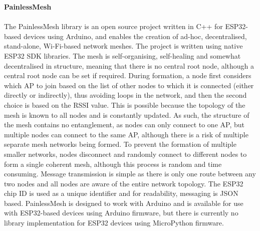 \textbf{PainlessMesh}\\\\
The PainlessMesh library is an open source project written in C++ for ESP32-based devices using Arduino, and enables the creation of ad-hoc, decentralised, stand-alone, Wi-Fi-based network meshes. The project is written using native ESP32 SDK libraries. The mesh is self-organising, self-healing and somewhat decentralised in structure, meaning that there is no central root node, although a central root node can be set if required. During formation, a node first considers which AP to join based on the list of other nodes to which it is connected (either directly or indirectly), thus avoiding loops in the network, and then the second choice is based on the RSSI value. This is possible because the topology of the mesh is known to all nodes and is constantly updated. As such, the structure of the mesh contains no entanglement, as nodes can only connect to one AP, but multiple nodes can connect to the same AP, although there is a risk of multiple separate mesh networks being formed. To prevent the formation of multiple smaller networks, nodes disconnect and randomly connect to different nodes to form a single coherent mesh, although this process is random and time consuming. Message transmission is simple as there is only one route between any two nodes and all nodes are aware of the entire network topology. The ESP32 chip ID is used as a unique identifier and for readability, messaging is JSON based.
PainlessMesh is designed to work with Arduino and is available for use with ESP32-based devices using Arduino firmware, but there is currently no library implementation for ESP32 devices using MicroPython firmware. \citep{van_leeuwen_painlessmesh_2019}\\

